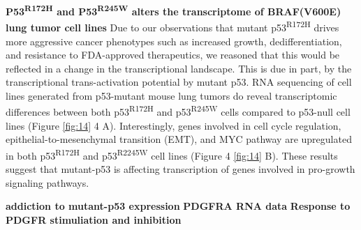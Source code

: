 \textbf{P53\textsuperscript{R172H} and P53\textsuperscript{R245W} alters the transcriptome of BRAF(V600E) lung tumor cell lines}
Due to our observations that mutant p53\textsuperscript{R172H} drives more aggressive cancer phenotypes such as increased growth, dedifferentiation, and resistance to FDA-approved therapeutics, we reasoned that this would be reflected in a change in the transcriptional landscape. This is due in part, by the transcriptional trans-activation potential by mutant p53. RNA sequencing of cell lines generated from p53-mutant mouse lung tumors do reveal transcriptomic differences between both p53\textsuperscript{R172H} and p53\textsuperscript{R245W} cells compared to p53-null cell lines (Figure \ref{fig:14} 4 A). Interestingly, genes involved in cell cycle regulation, epithelial-to-mesenchymal transition (EMT), and MYC pathway are upregulated in both p53\textsuperscript{R172H} and p53\textsuperscript{R2245W} cell lines (Figure 4 \ref{fig:14} B). These results suggest that mutant-p53 is affecting transcription of genes involved in pro-growth signaling pathways.

\textbf{addiction to mutant-p53 expression}
\textbf{PDGFRA RNA data}
\textbf{Response to PDGFR stimuliation and inhibition}

